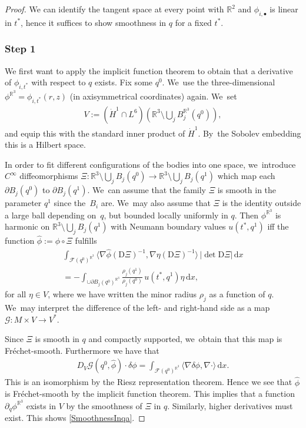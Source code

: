 \documentclass[JEP,XML,SOM,Unicode,published]{cedram}
\let\backslash\setminus
\let\ts\textstyle
\newcommand{\sbullet}{{\scriptscriptstyle\bullet}}
\theoremstyle{definition}
\newcommand\R{\mathbb{R}}
\newcommand\scalar[2]{\langle #1,#2\rangle}
\newcommand\bscalar[2]{\bigl\langle #1,#2\bigr\rangle}
\newcommand\eq{=}
\newcommand\dd{\,\mathrm{d}}
\newcommand\dx{\dd x}
\let\de\partial
\begin{document}
\begin{proof}
We can identify the tangent space at every point with $\R^2$ and $\phi_{i,\sbullet}$ is linear in $t^*$, hence it suffices to show smoothness in $q$ for a fixed $t^*$.

\subsubsection*{Step 1} We first want to apply the implicit function theorem to obtain that a derivative of $\phi_{i,t^*}$ with respect to $q$ exists. Fix some $q^0$. We~use the three-dimensional $\phi^{\R^3}=\phi_{i,t^*}(r,z)$ (in axisymmetrical coordinates) again. We~set
\begin{align*}
\ts
V:= (\dot{H}^1\cap L^6)(\R^3\backslash \bigcup_j B_j^{\R^3}(q^0)),
\end{align*}
and equip this with the standard inner product of $\dot{H}^1$. By~the Sobolev embedding this is a Hilbert space.

In order to fit different configurations of the bodies into one space, we~introduce $C^\infty$ diffeomorphisms $\Xi:\R^3\backslash\bigcup_j B_j(q^0)\to\R^3\backslash \bigcup_j B_j(q^1)$ which map each $\de B_j(q^0)$ to $\de B_j(q^1)$. We~can assume that the family $\Xi$ is smooth in the parameter $q^1$ since the~$B_i$ are. We~may also assume that $\Xi$ is the identity outside a large ball depending on~$q$, but bounded locally uniformly in $q$.
Then $\phi^{\R^3}$ is harmonic on $\R^3\backslash\bigcup_j B_j(q^1)$ with Neumann boundary values $u(t^*,q^1)$ iff the function $\hat{\phi}:=\phi\circ \Xi$ fulfills
\begin{multline}\label{PullbackEq}
\int_{\mathcal{F}(q^0)^{\R^3}}\bscalar{\nabla\hat{\phi}(\text{D}\Xi)^{-1}}{\nabla\eta(\text{D}\Xi)^{-1}}\,|{\det \text{D}\Xi}|\dx\\[-10pt]
\eq-\int_{\cup \de B_j(q^0)^{\R^3}}\frac{\rho_j(q^1)}{\rho_j(q^0)}\,u(t^*,q^1)\eta\dx,
\end{multline}
for all $\eta\in V$, where we have written the minor radius $\rho_j$ as a function of $q$. We~may interpret the difference of the left- and right-hand side as a map $\mathcal{G}:M\times V\to V^*$.

Since $\Xi$ is smooth in $q$ and compactly supported, we~obtain that this map is Fréchet-smooth. Furthermore we have that
\begin{align*}D_V\mathcal{G}(q^0,\hat{\phi})\cdot\delta\phi\eq\int_{\mathcal{F}(q^0)^{\R^3}} \scalar{\nabla\delta\phi}{\nabla\cdot}\dx.
\end{align*}
This is an isomorphism by the Riesz representation theorem. Hence we see that $\hat{\phi}$ is Fréchet-smooth by the implicit function theorem.
This implies that a function $\de_q\phi^{\R^3}$ exists in $V$ by the smoothness of $\Xi$ in $q$. Similarly, higher derivatives must exist. This shows \eqref{SmoothnessInqa}.


\end{proof}
\end{document}
